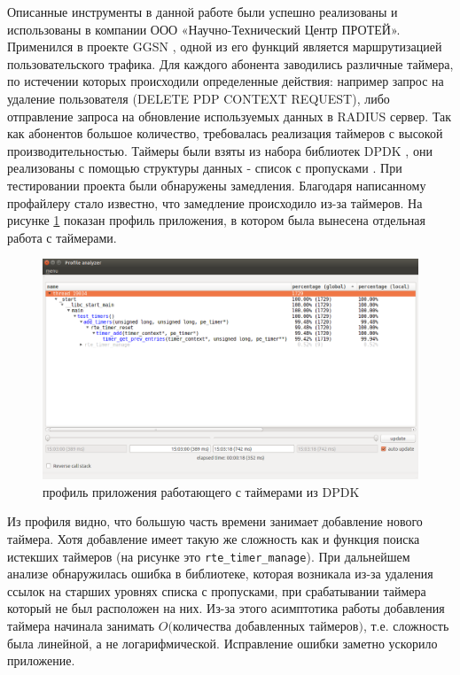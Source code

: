 
\startconclusionpage
	Описанные инструменты в данной работе были успешно реализованы и использованы в компании ООО «Научно-Технический Центр ПРОТЕЙ». Применился в проекте GGSN \cite{ggsn}, одной из его функций является маршрутизацией пользовательского трафика. Для каждого абонента заводились различные таймера, по истечении которых происходили определенные действия: например запрос на удаление пользователя (DELETE PDP CONTEXT REQUEST), либо отправление запроса на обновление используемых данных в RADIUS \cite{radius} сервер. Так как абонентов большое количество, требовалась реализация таймеров с высокой производительностью. Таймеры были взяты из набора библиотек DPDK \cite{dpdk}, они реализованы с помощью структуры данных - список с пропусками \cite{skip_list}. При тестировании проекта были обнаружены замедления. Благодаря написанному профайлеру стало известно, что замедление происходило из-за таймеров. На рисунке \ref{fig:slow_timers_profile} показан профиль приложения, в котором была вынесена отдельная работа с таймерами.
    \begin{figure}[H]
        \caption{профиль приложения работающего с таймерами из DPDK}
        \label{fig:slow_timers_profile}
        \centering
        \includegraphics[scale=0.4]{images/slow_timers_profile}
    \end{figure}    
    
    Из профиля видно, что большую часть времени занимает добавление нового таймера. Хотя добавление имеет такую же сложность как и функция поиска истекших таймеров (на рисунке это \verb|rte_timer_manage|). При дальнейшем анализе обнаружилась ошибка в библиотеке, которая возникала из-за удаления ссылок на старших уровнях списка с пропусками, при срабатывании таймера который не был расположен на них. Из-за этого асимптотика работы добавления таймера  начинала занимать $O($количества добавленных таймеров$)$, т.е. сложность была линейной, а не логарифмической. Исправление ошибки заметно ускорило приложение.    
    
